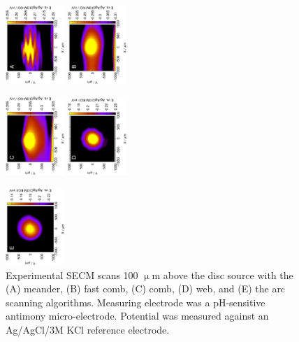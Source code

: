 \documentclass[3p]{elsarticle}
\begin{document}
\begin{figure}
\centering
\includegraphics[trim = 20mm 30mm 0mm 20mm, clip, width=0.2\textwidth, angle=-90]{meander.eps} \includegraphics[trim = 20mm 30mm 0mm 20mm, clip, width=0.2\textwidth, angle=-90]{fastcomb.eps}

\includegraphics[trim = 20mm 30mm 0mm 20mm, clip, width=0.2\textwidth, angle=-90]{comb.eps} \includegraphics[trim = 20mm 30mm 0mm 20mm, clip, width=0.2\textwidth, angle=-90]{web.eps}

\includegraphics[trim = 20mm 30mm 0mm 20mm, clip, width=0.2\textwidth, angle=-90]{arc.eps}

\caption{Experimental SECM scans 100 $\upmu$m above the disc source with the (A) meander, (B) fast comb, (C) comb, (D) web, and (E) the arc scanning algorithms. Measuring electrode was a pH-sensitive antimony micro-electrode. Potential was measured against an Ag/AgCl/3M KCl reference electrode.}
\label{fig:measurements}

\end{figure}
\end{document}
